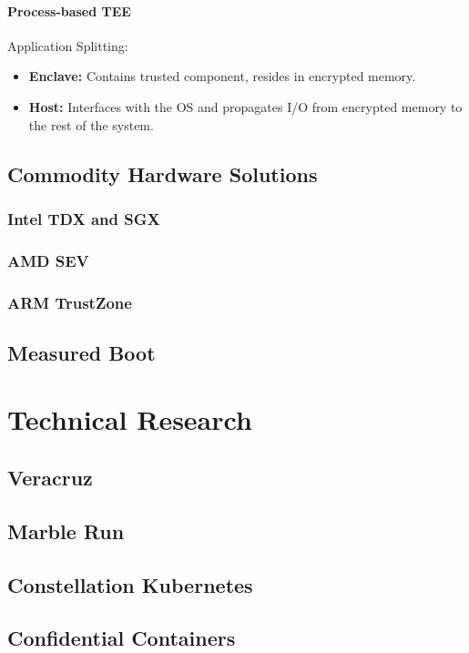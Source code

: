 \subsubsection{Process-based TEE}

Application Splitting:

\begin{itemize}
  \item \textbf{Enclave:} Contains trusted component, resides in encrypted
        memory.
  \item \textbf{Host:} Interfaces with the OS and propagates I/O from encrypted
        memory to the rest of the system.
\end{itemize}

\section{Commodity Hardware Solutions}

\subsection{Intel TDX and SGX}

\subsection{AMD SEV}

\subsection{ARM TrustZone}

\section{Measured Boot}


\chapter{Technical Research}

\section{Veracruz}

\section{Marble Run}

\section{Constellation Kubernetes}

\section{Confidential Containers}
